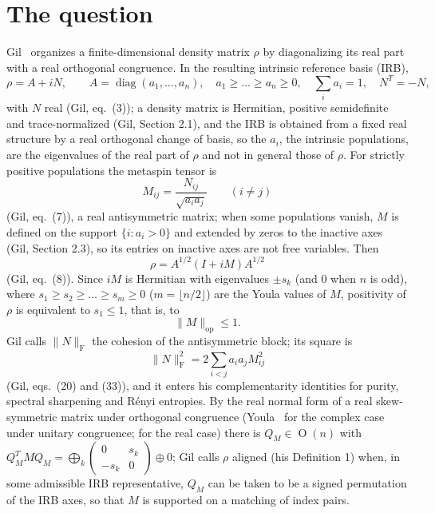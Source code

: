\documentclass[11pt]{article}
\newcommand{\F}{\mathrm F}
\newcommand{\op}{\mathrm{op}}
\DeclareMathOperator{\diag}{diag}
\DeclareMathOperator{\Orth}{O}
\begin{document}
\section{The question}

Gil~\cite{gil} organizes a finite-dimensional density matrix $\rho$ by
diagonalizing its real part with a real orthogonal congruence. In the
resulting intrinsic reference basis (IRB),
\begin{equation}\label{eq:irb}
\rho=A+iN,\qquad A=\diag(a_1,\dots,a_n),\quad a_1\ge\dots\ge a_n\ge0,\quad \sum_ia_i=1,\quad N^T=-N,
\end{equation}
with $N$ real (Gil, eq.~(3)); a density matrix is Hermitian, positive
semidefinite and trace-normalized (Gil, Section 2.1), and the IRB is obtained
from a fixed real structure by a real orthogonal change of basis, so the
$a_i$, the intrinsic populations, are the eigenvalues of the real part of
$\rho$ and not in general those of $\rho$. For strictly positive populations
the metaspin tensor is
\begin{equation}\label{eq:metaspin}
M_{ij}=\frac{N_{ij}}{\sqrt{a_ia_j}}\qquad(i\ne j)
\end{equation}
(Gil, eq.~(7)), a real antisymmetric matrix; when some populations vanish,
$M$ is defined on the support $\{i:a_i>0\}$ and extended by zeros to the
inactive axes (Gil, Section 2.3), so its entries on inactive axes are not
free variables. Then
\begin{equation}\label{eq:factor}
\rho=A^{1/2}(I+iM)A^{1/2}
\end{equation}
(Gil, eq.~(8)). Since $iM$ is Hermitian with eigenvalues $\pm s_k$ (and $0$
when $n$ is odd), where
$s_1\ge s_2\ge\dots\ge s_m\ge0$ ($m=\lfloor n/2\rfloor$) are the Youla values
of $M$, positivity of $\rho$ is equivalent to $s_1\le1$, that is, to
\begin{equation}\label{eq:contraction}
\|M\|_\op\le1 .
\end{equation}
Gil calls $\|N\|_\F$ the cohesion of the antisymmetric block; its square is
\begin{equation}\label{eq:cohesion}
\|N\|_\F^2=2\sum_{i<j}a_ia_jM_{ij}^2
\end{equation}
(Gil, eqs.~(20) and (33)), and it enters his complementarity identities for
purity, spectral sharpening and R\'enyi entropies. By the real normal form of
a real skew-symmetric matrix under orthogonal congruence (Youla~\cite{youla}
for the complex case under unitary congruence; \cite[Section~2.5]{hjma} for the
real case) there is $Q_M\in\Orth(n)$ with
$Q_M^TMQ_M=\bigoplus_k\left(\begin{smallmatrix}0&s_k\\-s_k&0\end{smallmatrix}\right)\oplus0$;
Gil calls $\rho$ aligned (his Definition 1) when, in some admissible IRB
representative, $Q_M$ can be taken to be a signed permutation of the IRB axes,
so that $M$ is supported on a matching of index pairs.
\end{document}
